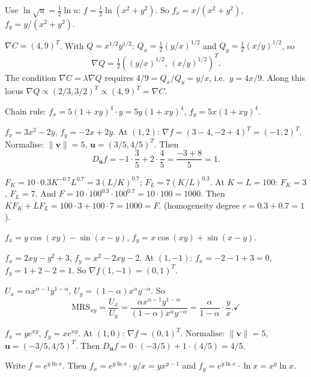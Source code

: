 \begin{solutions}
  \item Use $\ln\sqrt{u}=\frac12\ln u$: $f=\frac12\ln(x^2+y^2)$. So
        $f_x=x/(x^2+y^2)$, $f_y=y/(x^2+y^2)$.

  \item $\nabla C=(4,9)^T$. With $Q=x^{1/2}y^{1/2}$: $Q_x=\frac12(y/x)^{1/2}$
        and $Q_y=\frac12(x/y)^{1/2}$, so
        \[
          \nabla Q=\tfrac12\left((y/x)^{1/2},\,(x/y)^{1/2}\right)^{T} .
        \]
        The condition $\nabla C=\lambda\nabla Q$ requires
        $4/9=Q_x/Q_y=y/x$, i.e.\ $y=4x/9$. Along this locus
        $\nabla Q\propto(2/3,3/2)^T\propto(4,9)^T=\nabla C$. \checkmark

  \item Chain rule: $f_x=5(1+xy)^4\cdot y=5y(1+xy)^4$,
        $f_y=5x(1+xy)^4$.

  \item $f_x=3x^2-2y$, $f_y=-2x+2y$. At $(1,2)$:
        $\nabla f=(3-4,-2+4)^T=(-1,2)^T$. Normalise: $\|\mathbf{v}\|=5$,
        $\mathbf{u}=(3/5,4/5)^T$. Then
        \[
          D_{\mathbf{u}}f=-1\cdot\frac35+2\cdot\frac45
            =\frac{-3+8}{5}=1 .
        \]

  \item $F_K=10\cdot0.3K^{-0.7}L^{0.7}=3(L/K)^{0.7}$;
        $F_L=7(K/L)^{0.3}$. At $K=L=100$: $F_K=3$, $F_L=7$. And
        $F=10\cdot100^{0.3}\cdot100^{0.7}=10\cdot100=1000$. Then
        $KF_K+LF_L=100\cdot3+100\cdot7=1000=F$. \checkmark (homogeneity
        degree $r=0.3+0.7=1$).

  \item $f_x=y\cos(xy)-\sin(x-y)$, $f_y=x\cos(xy)+\sin(x-y)$.

  \item $f_x=2xy-y^2+3$, $f_y=x^2-2xy-2$. At $(1,-1)$: $f_x=-2-1+3=0$,
        $f_y=1+2-2=1$. So $\nabla f(1,-1)=(0,1)^T$.

  \item $U_x=\alpha x^{\alpha-1}y^{1-\alpha}$,
        $U_y=(1-\alpha)x^\alpha y^{-\alpha}$. So
        \[
          \mathrm{MRS}_{xy}=\frac{U_x}{U_y}
            =\frac{\alpha x^{\alpha-1}y^{1-\alpha}}{(1-\alpha)x^\alpha y^{-\alpha}}
            =\frac{\alpha}{1-\alpha}\cdot\frac{y}{x} . \checkmark
        \]

  \item $f_x=ye^{xy}$, $f_y=xe^{xy}$. At $(1,0)$: $\nabla f=(0,1)^T$.
        Normalise: $\|\mathbf{v}\|=5$, $\mathbf{u}=(-3/5,4/5)^T$. Then
        $D_{\mathbf{u}}f=0\cdot(-3/5)+1\cdot(4/5)=4/5$.

  \item Write $f=e^{y\ln x}$. Then $f_x=e^{y\ln x}\cdot y/x=yx^{y-1}$ and
        $f_y=e^{y\ln x}\cdot\ln x=x^y\ln x$.


\end{solutions}
